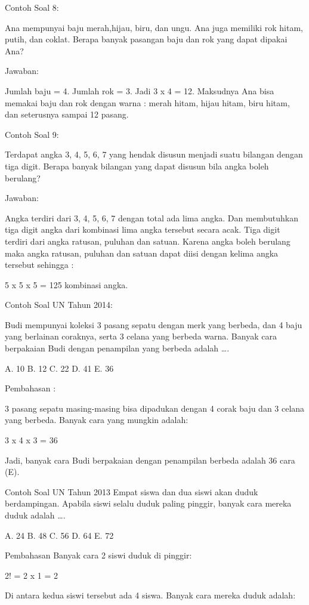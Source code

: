 \documentclass[11pt,fleqn]{book} %
\begin{document}
Contoh Soal 8:

Ana mempunyai baju merah,hijau, biru, dan ungu. Ana juga memiliki rok hitam, putih, dan coklat. Berapa banyak pasangan baju dan rok yang dapat dipakai Ana?

Jawaban:

Jumlah baju = 4. 
Jumlah rok = 3.
 Jadi 3 x 4 = 12.
 Maksudnya Ana bisa memakai baju dan rok dengan warna : 
merah hitam, hijau hitam, biru hitam, dan seterusnya sampai 12 pasang.

Contoh Soal 9: 

Terdapat angka 3, 4, 5, 6, 7 yang hendak disusun menjadi suatu bilangan dengan tiga digit. 
Berapa banyak bilangan yang dapat disusun bila angka boleh berulang?

Jawaban:

Angka terdiri dari 3, 4, 5, 6, 7 dengan total ada lima angka. Dan membutuhkan tiga digit angka dari kombinasi lima angka tersebut secara acak. Tiga digit terdiri dari angka ratusan, puluhan dan satuan. Karena angka boleh berulang maka angka ratusan, puluhan dan satuan dapat diisi dengan kelima angka tersebut sehingga :

 5 x 5 x 5 = 125 kombinasi angka.
 
Contoh Soal UN Tahun 2014:

Budi mempunyai koleksi 3 pasang sepatu dengan merk yang berbeda, dan 4 baju yang berlainan coraknya, serta 3 celana yang berbeda warna. Banyak cara berpakaian Budi dengan penampilan yang berbeda adalah ….

A.   10
B.   12
C.   22
D.   41
E.   36

Pembahasan :

3 pasang sepatu masing-masing bisa dipadukan dengan 4 corak baju dan 3 celana yang berbeda. Banyak cara yang mungkin adalah:

3 x 4 x 3 = 36

Jadi, banyak cara Budi berpakaian dengan penampilan berbeda adalah 36 cara (E).

Contoh Soal UN Tahun 2013
Empat siswa dan dua siswi akan duduk berdampingan. Apabila siswi selalu duduk paling pinggir, banyak cara mereka duduk adalah ….

A.   24
B.   48
C.   56
D.   64
E.   72

Pembahasan
Banyak cara 2 siswi duduk di pinggir:

2! = 2 x 1 = 2

Di antara kedua siswi tersebut ada 4 siswa. Banyak cara mereka duduk adalah:
\end{document}
